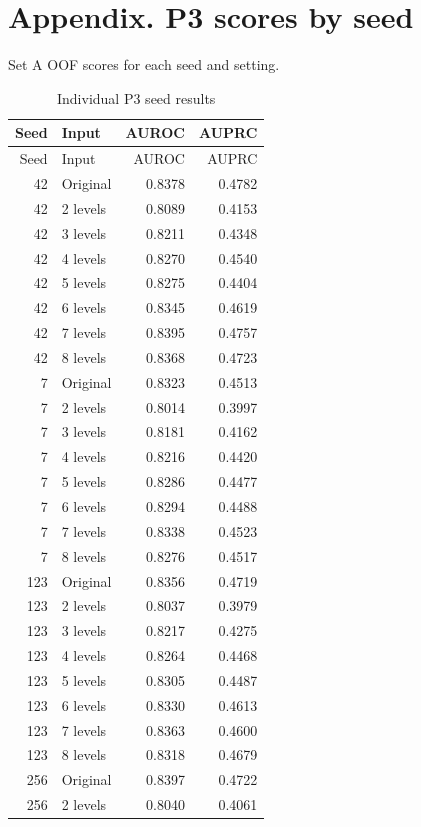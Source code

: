 \documentclass[11pt,a4paper]{article}
\begin{document}
\clearpage
\appendix
\section*{Appendix. P3 scores by seed}
Set A OOF scores for each seed and setting.

\begin{longtable}{rlrr}
\caption{Individual P3 seed results}\\
\toprule
Seed & Input & AUROC & AUPRC\\
\midrule
\endfirsthead
\toprule
Seed & Input & AUROC & AUPRC\\
\midrule
\endhead
42 & Original & 0.8378 & 0.4782 \\
42 & 2 levels & 0.8089 & 0.4153 \\
42 & 3 levels & 0.8211 & 0.4348 \\
42 & 4 levels & 0.8270 & 0.4540 \\
42 & 5 levels & 0.8275 & 0.4404 \\
42 & 6 levels & 0.8345 & 0.4619 \\
42 & 7 levels & 0.8395 & 0.4757 \\
42 & 8 levels & 0.8368 & 0.4723 \\
7 & Original & 0.8323 & 0.4513 \\
7 & 2 levels & 0.8014 & 0.3997 \\
7 & 3 levels & 0.8181 & 0.4162 \\
7 & 4 levels & 0.8216 & 0.4420 \\
7 & 5 levels & 0.8286 & 0.4477 \\
7 & 6 levels & 0.8294 & 0.4488 \\
7 & 7 levels & 0.8338 & 0.4523 \\
7 & 8 levels & 0.8276 & 0.4517 \\
123 & Original & 0.8356 & 0.4719 \\
123 & 2 levels & 0.8037 & 0.3979 \\
123 & 3 levels & 0.8217 & 0.4275 \\
123 & 4 levels & 0.8264 & 0.4468 \\
123 & 5 levels & 0.8305 & 0.4487 \\
123 & 6 levels & 0.8330 & 0.4613 \\
123 & 7 levels & 0.8363 & 0.4600 \\
123 & 8 levels & 0.8318 & 0.4679 \\
256 & Original & 0.8397 & 0.4722 \\
256 & 2 levels & 0.8040 & 0.4061 \\

\end{longtable}
\end{document}

